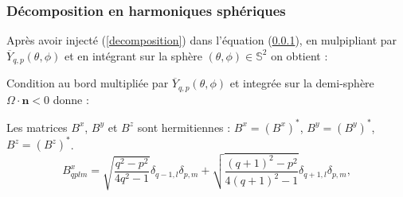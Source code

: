 \begin{frame}
\frametitle{Décomposition en harmoniques sphériques}
Après avoir injecté (\ref{decomposition}) dans l'équation (\ref{}), en mulpipliant par $\overline{Y}_{q,p}(\theta,\phi)$ et en intégrant sur la sphère $(\theta,\phi)\in\mathbb{S}^2$ on obtient :

\medskip
{}
\medskip

Condition au bord multipliée par $\overline{Y}_{q,p}(\theta,\phi)$ et integrée sur la demi-sphère ${\Omega}\cdot\mathbf{n}<0$ donne :

\medskip
{}

\medskip
Les matrices $B^x$, $B^y$ et $B^z$ sont hermitiennes : $B^x=(B^x)^*$, $B^y=(B^y)^*$, $B^z=(B^z)^*$.
\smallskip
\begin{equation*}
B^x_{qplm}=\sqrt{\frac{q^2-p^2}{4q^2-1}}\delta_{q-1,l}\delta_{p,m}+\sqrt{\frac{(q+1)^2-p^2}{4(q+1)^2-1}}\delta_{q+1,l}\delta_{p,m},
\end{equation*}
\end{frame}

